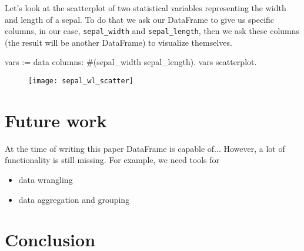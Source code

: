 \documentclass{article}
\begin{document}
\begin{multicols}{2}
Let's look at the scatterplot of two statistical variables representing the width and length of a sepal. To do that we ask our DataFrame to give us specific columns, in our case, \texttt{sepal\_width} and \texttt{sepal\_length}, then we ask these columns (the result will be another DataFrame) to visualize themselves.

\begin{code}{}
vars := data columns: #(sepal_width sepal_length).
vars scatterplot.
\end{code}

\begin{figure}[H]
  \begin{center}
  \texttt{[image: sepal\_wl\_scatter]}
  \end{center}
\end{figure}

%
%


%

\section{Future work}
At the time of writing this paper DataFrame is capable of...
However, a lot of functionality is still missing. For example, we need tools for
\begin{itemize}
  \item data wrangling
  \item data aggregation and grouping
\end{itemize}

\section{Conclusion}
\label{sec:conclusion}


\end{multicols}
\end{document}
